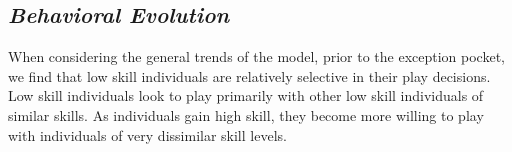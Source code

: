 \documentclass[12pt, letterpaper, fleqn]{article}
\begin{document}
      
      
 
  
        
  \subsection*{\it Behavioral Evolution}
      When considering the general trends of the model, prior to the exception pocket, we find that low skill individuals are relatively selective in their play decisions. 
      Low skill individuals look to play primarily with other low skill individuals of similar skills.
      As individuals gain high skill, they become more willing to play with individuals of very dissimilar skill levels. 
      
\end{document}
